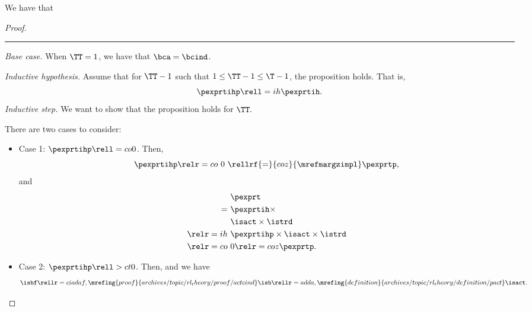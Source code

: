 \begin{proposition}
  We have that %
\end{proposition}

\begin{proof}
  \hrule
  {\it Base case.}
  When $\TT = 1$,
  we have  that
  $\bca = \bcind$.

  \srule
  {\it Inductive hypothesis.}
  Assume that for $\TT - 1$ such that $1 \le \TT - 1 \le \T - 1$,
  the proposition holds. That is,
  $$ \pexprtihp \rell = ih \pexprtih.$$%
  \srule
  {\it Inductive step.}
  We want to show that the proposition holds for $\TT.$

  There are two cases to consider:
  \begin{itemize}
    \item Case 1: $\pexprtihp \rell = co 0$. 
      Then,
      $$\pexprtihp \relr = co \ 0\  \rellrf{=}{coz}{\mrefmargzimpl} \pexprtp,$$
      and
      \begin{align*}
        &\pexprt \\
        =\ &\pexprtih \times \\
        &\isact \times \istrd\\
        \relr = ih \ & \pexprtihp \times \isact \times \istrd \\
        \relr = co \ & 0 \relr = coz \pexprtp.
      \end{align*}
    \item Case 2: $\pexprtihp \rell > ct 0$. 
      Then, 
      and we have
      $$\isbf \rellr = cia daf,\mreflng{proof}{archives/topic/rl_theory/proof/actcind} \isb 
      \rellr = ad da,\mreflng{definition}{archives/topic/rl_theory/definition/pact} \isact.$$


\end{itemize}
\end{proof}
